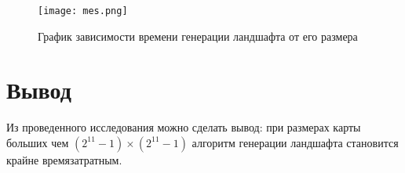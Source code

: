 \begin{figure}[H]
	\centering
	\texttt{[image: mes.png]}
	\caption{График зависимости времени генерации ландшафта от его размера}
	\label{fig:mes}
\end{figure}

\section*{Вывод}
Из проведенного исследования можно сделать вывод: при размерах карты больших чем $(2^{11} - 1) \times (2^{11} - 1)$ алгоритм генерации ландшафта становится крайне времязатратным. 
